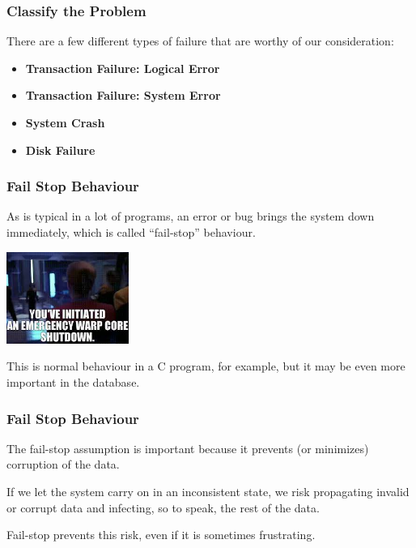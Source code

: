 \begin{frame}
\frametitle{Classify the Problem}

There are a few different types of failure that are worthy of our consideration:

\begin{itemize}
	\item \textbf{Transaction Failure: Logical Error} 
	\item \textbf{Transaction Failure: System Error} 
	\item \textbf{System Crash} 
	\item \textbf{Disk Failure} 
\end{itemize}

\end{frame}

\begin{frame}
\frametitle{Fail Stop Behaviour}

As is typical in a lot of programs, an error or bug brings the system down immediately, which is called ``fail-stop'' behaviour. 

\begin{center}
	\includegraphics[width=0.3\textwidth]{images/shutdown.jpg}
\end{center}

This is normal behaviour in a C program, for example, but it may be even more important in the database. 

\end{frame}

\begin{frame}
\frametitle{Fail Stop Behaviour}


The fail-stop assumption is important because it prevents (or minimizes) corruption of the data. 

If we let the system carry on in an inconsistent state, we risk propagating invalid or corrupt data and infecting, so to speak, the rest of the data. 

Fail-stop prevents this risk, even if it is sometimes frustrating.


\end{frame}

